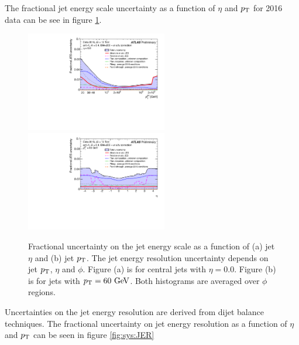 \indent The fractional jet energy scale uncertainty as a function of $\eta$ and $\pt$ for 2016 data can be see in figure \ref{fig:sys:JES}. \\

\begin{figure}[!h]
\begin{center}
\includegraphics[width=0.55\textwidth, angle=270]{figures/JetCalib/JES_pt.pdf}
\includegraphics[width=0.55\textwidth, angle=270]{figures/JetCalib/JES_eta.pdf}
\caption[Fractional uncertainty on the jet energy scale vs jet $\eta$ and jet $\pt$. ]{Fractional uncertainty on the jet energy scale as a function of (a) jet $\eta$ and (b) jet $\pt$.  The jet energy resolution uncertainty depends on jet $\pt$, $\eta$ and $\phi$. Figure (a) is for central jets with $\eta = 0.0$.  Figure (b) is for jets with $\pt = 60 \gev$.  Both histograms are averaged over $\phi$ regions.}
\label{fig:sys:JES}
\end{center}
\end{figure}

\indent Uncertainties on the jet energy resolution are derived from dijet balance techniques.\cite{JES_dijet}  The fractional uncertainty on jet energy resolution as a function of $\eta$ and $\pt$ can be seen in figure \ref{fig:sys:JER}\\

